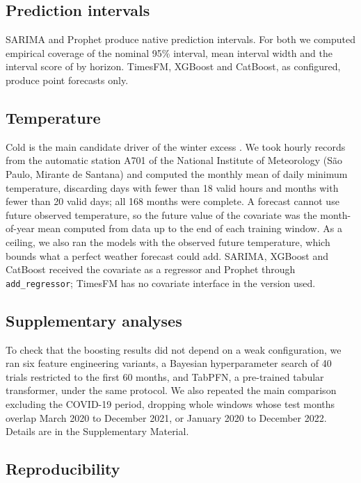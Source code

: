 \subsection{Prediction intervals}

SARIMA and Prophet produce native prediction intervals. For both we computed empirical
coverage of the nominal 95\% interval, mean interval width and the interval score of
\citet{gneiting2007} by horizon. TimesFM, XGBoost and CatBoost, as configured, produce point
forecasts only.

\subsection{Temperature}

Cold is the main candidate driver of the winter excess \citep{analitis2008, phung2016,
ferreira2019}. We took hourly records from the automatic station A701 of the National
Institute of Meteorology (S\~ao Paulo, Mirante de Santana) \citep{inmet} and computed the
monthly mean of daily minimum temperature, discarding days with fewer than 18 valid hours
and months with fewer than 20 valid days; all 168 months were complete. A forecast cannot
use future observed temperature, so the future value of the covariate was the month-of-year
mean computed from data up to the end of each training window. As a ceiling, we also ran the
models with the observed future temperature, which bounds what a perfect weather forecast
could add. SARIMA, XGBoost and CatBoost received the covariate as a regressor and Prophet
through \texttt{add\_regressor}; TimesFM has no covariate interface in the version used.

\subsection{Supplementary analyses}

To check that the boosting results did not depend on a weak configuration, we ran six
feature engineering variants, a Bayesian hyperparameter search of 40 trials restricted to
the first 60 months, and TabPFN, a pre-trained tabular transformer, under the same protocol.
We also repeated the main comparison excluding the COVID-19 period, dropping whole windows
whose test months overlap March 2020 to December 2021, or January 2020 to December 2022.
Details are in the Supplementary Material.

\subsection{Reproducibility}\label{sec:repro}


